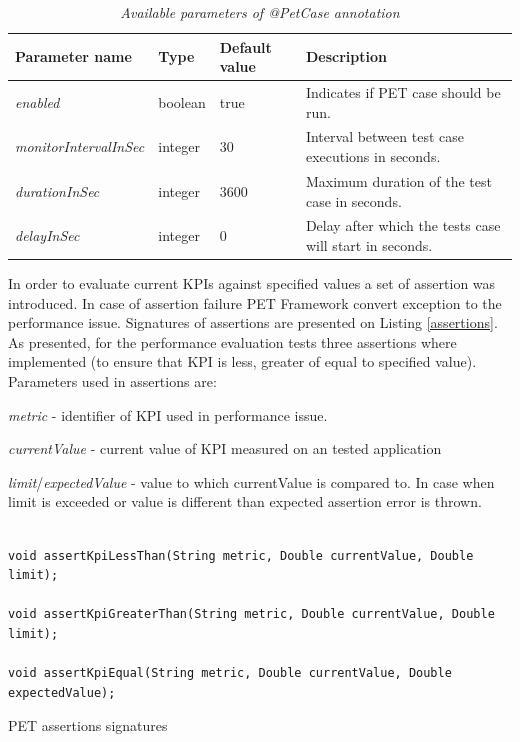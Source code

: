 \documentclass[12pt,a4paper]{article}
\let\tempone\itemize
\let\temptwo\enditemize
\renewenvironment{itemize}{\tempone\addtolength{\itemsep}{-0.4\baselineskip}}{\temptwo}
\begin{document}
\begin{table}[!htb]
\def\arraystretch{1.5}
\caption{\textit{Available parameters of @PetCase annotation}}\label{petcase}
\begin{tabularx}{\textwidth}{p{3.1cm}|p{1.3cm}|p{1.1cm}|X}
  \textbf{Parameter name} &\textbf{Type} & \textbf{Default value} & \textbf{Description} \\
\hline
			\textit{enabled} & boolean & true & Indicates if PET case should be run.\\
			\textit{monitorIntervalInSec} & integer & 30 & Interval between test case executions in seconds.\\
			\textit{durationInSec} & integer & 3600 & Maximum duration of the test case in seconds.\\
			\textit{delayInSec} & integer & 0 & Delay after which the tests case will start in seconds.\\
\end{tabularx}
\end{table}			

In order to evaluate current KPIs against specified values a set of assertion was introduced. In case of assertion failure PET Framework convert exception to the performance issue. Signatures of assertions are presented on Listing  \ref{assertions}. As presented, for the performance evaluation tests three assertions where implemented (to ensure that KPI is less, greater of equal to specified value).  Parameters used in assertions are: 
\begin{itemize} 
\item \textit{metric} - identifier of KPI used in performance issue.
\item \textit{currentValue} - current value of KPI measured on an tested application
\item \textit{limit}/\textit{expectedValue} - value to which currentValue is compared to. In case when limit is exceeded or value is different than expected assertion error is thrown.
\end{itemize}

\begin{listing}[ht]\begin{verbatim}

void assertKpiLessThan(String metric, Double currentValue, Double limit);

void assertKpiGreaterThan(String metric, Double currentValue, Double limit);

void assertKpiEqual(String metric, Double currentValue, Double expectedValue);
\end{verbatim}
\caption{PET assertions signatures} \label{assertions}
\end{listing}
\end{document}
